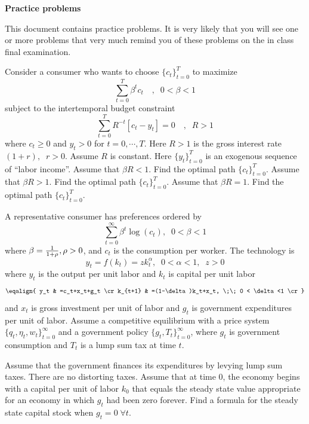 

\paper

\overfullrule=0pt
\def\frac#1#2{#1\over #2}
%
\def\bmatrix#1{\left[ \matrix{#1} \right]}
\def\be{{\beta}}
\def\toone{{t+1}}

\overfullrule=0pt


\centerline{\bf Practice problems}


\medskip

  This document contains practice problems.  It is very likely that you will see one or more problems that very much
remind you of these problems on the in class final examination.
 


\medskip
{}
\medskip \noindent  Consider a consumer who wants to choose $\{c_t\}_{t=0}^T$ to maximize
$$\sum_{t=0}^T \beta^tc_t  \quad  , \;\;  0< \beta<1$$ subject to the intertemporal budget constraint
$$\sum_{t=0}^T R^{-t}[c_t-y_t]=0  \quad  , \;\;  R>1$$ where $c_t\geq0$ and $y_t>0$ for $t=0,\cdots,T$. Here $R>1$ is the gross interest rate $(1+r),\;\; r>0$. Assume $R$ is constant. Here $\{y_t\}_{t=0}^T $ is an exogenous sequence of ``labor income''.
\medskip
{} Assume that $\beta R < 1$. Find the optimal path $\{c_t\}_{t=0}^T$.
\medskip
{} Assume that $\beta R > 1$. Find the optimal path $\{c_t\}_{t=0}^T$.
\medskip
{} Assume that $\beta R = 1$. Find the optimal path $\{c_t\}_{t=0}^T$.

\medskip
{}
\medskip
\noindent
 A representative consumer has preferences ordered by
 $$ \sum_{t=0}^\infty \beta^t \log(c_t), \;\;  0< \beta<1$$
 where $\beta = {\frac{1}{1+\rho}}, \rho>0$, and $c_t$ is the consumption per worker.
The technology is $$ y_t=f(k_t)=zk_t^\alpha, \;\; 0<\alpha<1, \;\; z>0 $$
where $y_t$ is the output per unit labor and $k_t$ is capital per unit labor
$$\eqalign{
y_t & =c_t+x_t+g_t \cr
  k_{t+1} & =(1-\delta)k_t+x_t, \;\;  0 < \delta<1 \cr
}$$
and $x_t$ is  gross investment per unit of labor and $g_t$ is  government expenditures per unit of labor.
Assume a competitive equilibrium with a price system $\{q_t,\eta_t,w_t\}_{t=0}^\infty$ and a government policy $\{g_t,T_t\}_{t=0}^\infty$, where 
$g_t$ is government consumption and $T_t$ is a lump sum tax at time $t$.

 Assume that the government finances its expenditures by levying lump sum taxes. There are no distorting taxes. Assume that at time 0, the economy begins
 with a capital per unit of labor $k_0$ that equals the steady state value appropriate for an economy in which $g_t$ had been zero forever.
\medskip
{} Find a formula for the steady state capital stock when $g_t=0 \; \forall t$.
\medskip

